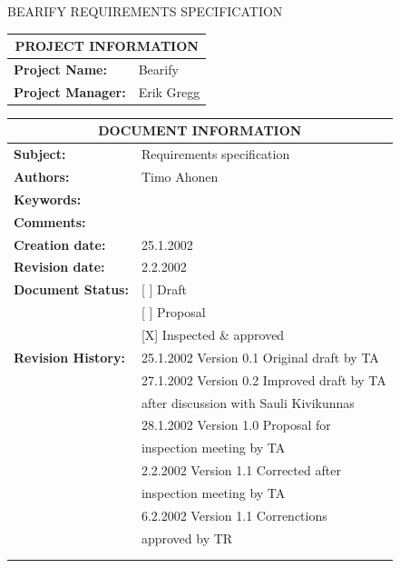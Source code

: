\documentclass[a4paper,11pt]{article}
\begin{document}
 
\thispagestyle{empty}
\vspace*{2cm}
\begin{center}
{\LARGE BEARIFY REQUIREMENTS SPECIFICATION}

\vspace{1.5cm}

\begin{tabular}{|l|l|}							\hline
\multicolumn{2}{|c|}{\textbf{PROJECT INFORMATION}} 		\\	\hline
\textbf{Project Name:}		& Bearify \\ \hline
\textbf{Project Manager:}	& Erik Gregg \\	\hline
\end{tabular}

\vspace{2cm}

\begin{tabular}{|l|l|}							\hline
 \multicolumn{2}{|c|}{\textbf{DOCUMENT INFORMATION}}  \\	\hline
\textbf{Subject:}		& Requirements specification	\\	\hline
\textbf{Authors:}		& Timo Ahonen			\\	\hline
\textbf{Keywords:}		&				\\	\hline
\textbf{Comments:}		&				\\	\hline
\textbf{Creation date:}		& 25.1.2002 			\\	\hline
\textbf{Revision date:}		& 2.2.2002			\\	\hline
\textbf{Document Status:}	& [ ] Draft			\\	\hline
				& [ ] Proposal			\\	\hline
				& [X] Inspected \& approved	\\	\hline
\textbf{Revision History:}	& 25.1.2002 Version 0.1 Original draft by TA \\	\hline
				& 27.1.2002 Version 0.2 Improved draft by TA  \\
				& after discussion with Sauli Kivikunnas		\\ 	\hline
				& 28.1.2002 Version 1.0 Proposal for \\
				& inspection  meeting by TA  \\ \hline	
				& 2.2.2002 Version 1.1 Corrected after  \\
				& inspection meeting by TA\\ 	\hline
				& 6.2.2002 Version 1.1 Correnctions \\
				& approved by TR  \\ 	\hline
				& { } 				\\ 	\hline
				& { } 				\\ 	\hline
\end{tabular}
\end{center}
\newpage
\end{document}
